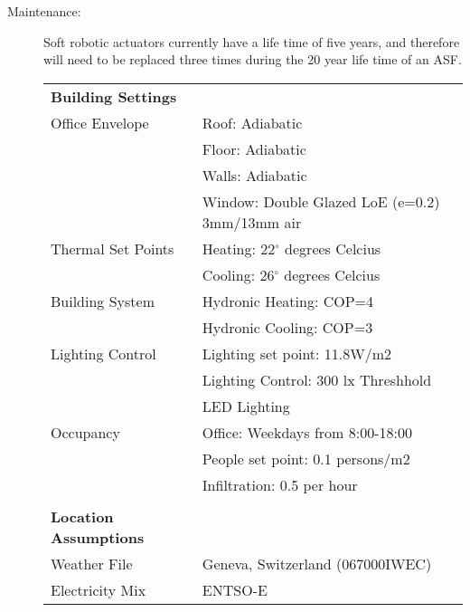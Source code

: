 \begin{description}
\item[Maintenance: ] Soft robotic actuators currently have a life time of five years, and therefore will need to be replaced three times during the 20 year life time of an ASF.

\begin{table}[H]
\centering
\begin{tabular}{ll}
\hline
\textbf{Building Settings}    &                                                \\
Office Envelope               & Roof: Adiabatic                                \\
                              & Floor: Adiabatic                               \\
                              & Walls: Adiabatic                               \\
                              & Window: Double Glazed LoE (e=0.2) 3mm/13mm air \\
Thermal Set Points            & Heating: 22$^{\circ}$ degrees Celcius          \\
                              & Cooling: 26$^{\circ}$ degrees Celcius          \\
Building System               & Hydronic Heating: COP=4                        \\
                              & Hydronic Cooling: COP=3                        \\
Lighting Control              & Lighting set point: 11.8W/m2                   \\
                              & Lighting Control: 300 lx Threshhold            \\
                              & LED Lighting                                   \\
Occupancy                     & Office: Weekdays from 8:00-18:00               \\
                              & People set point: 0.1 persons/m2               \\
                              & Infiltration: 0.5 per hour                     \\
                              &                                                \\
\textbf{Location Assumptions} &                                                \\
Weather File                  & Geneva, Switzerland (067000IWEC)               \\
Electricity Mix               & ENTSO-E \cite{itten2012life}                   \\

\end{tabular}
\end{table}
\end{description}

